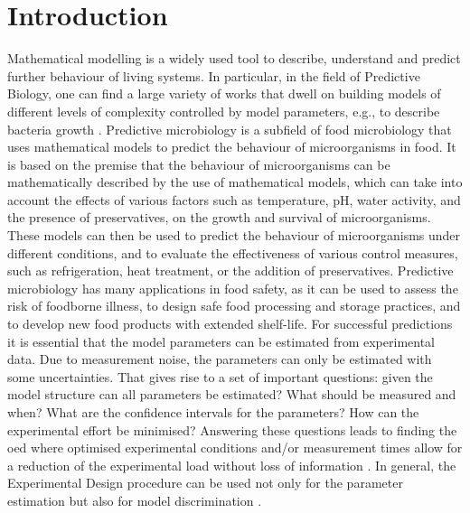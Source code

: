 \documentclass[10pt,A4paper]{article}
\begin{document}
\section*{Introduction}
%
Mathematical modelling is a widely used tool to describe, understand and predict further behaviour of living systems.
In particular, in the field of Predictive Biology, one can find a large variety of works that dwell on building models of different levels of complexity controlled by model parameters, e.g., to describe bacteria growth \cite{bernaertsConceptsToolsPredictive2004}. 
Predictive microbiology is a subfield of food microbiology that uses mathematical models to predict the behaviour of microorganisms in food.  
It is based on the premise that the behaviour of microorganisms can be mathematically described by the use of mathematical models, which can take into account the effects of various factors such as temperature, pH, water activity, and the presence of preservatives, on the growth and survival of microorganisms. 
These models can then be used to predict the behaviour of microorganisms under different conditions, and to evaluate the effectiveness of various control measures, such as refrigeration, heat treatment, or the addition of preservatives. 
Predictive microbiology has many applications in food safety, as it can be used to assess the risk of foodborne illness, to design safe food processing and storage practices, and to develop new food products with extended shelf-life. 
For successful predictions it is essential that the model parameters can be estimated from experimental data. 
Due to measurement noise, the parameters can only be estimated with some uncertainties. 
That gives rise to a set of important questions: given the model structure can all parameters be estimated? 
What should be measured and when? What are the confidence intervals for the parameters? How can the experimental effort be minimised? 
Answering these questions leads to finding the \ac{oed} where optimised experimental conditions and/or measurement times allow for a reduction of the experimental load without loss of information \cite{derlindenImpactExperimentDesign2013, balsa-cantoe.bangaj.r.COMPUTINGOPTIMALDYNAMIC2008}. 
In general, the Experimental Design procedure can be used not only for the parameter estimation but also for model discrimination \cite{kreutzSystemsBiology2009, stamatiOptimalExperimentalDesign2016}. 
\end{document}
